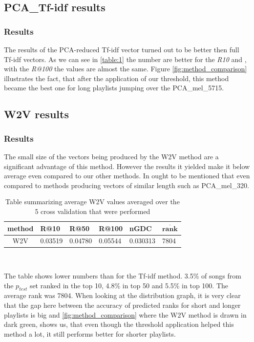 \subsection{PCA\_Tf-idf results}

\subsubsection{Results}
The results of the PCA-reduced Tf-idf vector turned out to be better then full Tf-idf vectors. As we can see in \ref{table:1} the number are better for the \textit{R10} and , with the \textit{R@100} the values are almost the same. Figure \ref{fig:method_comparison} illustrates the fact, that after the application of our threshold, this method became the best one for long playlists jumping over the PCA\_mel\_5715. 

\subsection{W2V results}

\subsubsection{Results}
The small size of the vectors being produced by the W2V method are a significant advantage of this method. However the results it yielded make it below average even compared to our other methods. In ought to be mentioned that even compared to methods producing vectors of similar length such as PCA\_mel\_320.

\begin{table}[h]
\centering
\renewcommand{\arraystretch}{1.5}
\begin{tabu} to 1\textwidth { | c || X[c] | X[c] | X[c] | X[c] | X[c] |}
 \hline
 \textbf{method} & \textbf{R@10} & \textbf{R@50} & \textbf{R@100} & \textbf{nGDC} & $ \boldsymbol{\overline{rank}} $ \\
 \hline
 \hline
 W2V & 0.03519 & 0.04780 & 0.05544 & 0.030313 & 7804 \\
 \hline
\end{tabu} \\
\caption{Table summarizing average W2V values averaged over the 5 cross validation that were performed}
\label{table:2}
\end{table}

The table shows lower numbers than for the Tf-idf method. 3.5\% of songs from the $ p_{test} $ set ranked in the top 10, 4.8\% in top 50 and 5.5\% in top 100. The average rank was 7804. When looking at the distribution graph, it is very clear that the gap here between the accuracy of predicted ranks for short and longer playlists is big and \ref{fig:method_comparison} where the W2V method is drawn in dark green, shows us, that even though the threshold application helped this method a lot, it still performs better for shorter playlists. 

